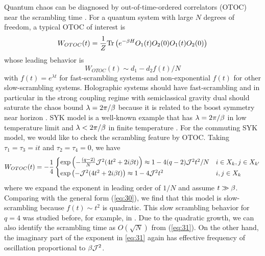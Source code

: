 \documentclass[11pt]{article}
\renewcommand{\>}{\rangle}
\newcommand{\<}{\langle}
\begin{document}
Quantum chaos can be diagnosed by out-of-time-ordered correlators
(OTOC) near the scrambling time \cite{Shenker:2013pqa, kitaev2014hidden, Roberts:2014ifa}. For a quantum system with large $N$ degrees of freedom, a typical OTOC of interest
is 
\begin{equation}
W_{OTOC}(t)=\frac{1}{Z}\text{Tr}\left(e^{-\beta H}O_{1}(t)O_{2}(0)O_{1}(t)O_{2}(0)\right)\label{eq:29}
\end{equation}
whose leading behavior is
\begin{equation}
W_{OTOC}(t)\sim d_{1}-d_{2}f(t)/N\label{eq:30}
\end{equation}
with $f(t)=e^{\lambda t}$ for fast-scrambling systems \cite{Shenker:2013pqa, kitaev2014hidden, Roberts:2014ifa,Shenker:2013yza,Shenker:2014cwa,Maldacena:2016hyu} and
non-exponential $f(t)$ for other slow-scrambling systems.
Holographic systems should have fast-scrambling and in particular
in the strong coupling regime with semiclassical gravity dual should saturate
the chaos bound $\lambda=2\pi/\beta$ \cite{Maldacena:2015waa} because it is related
to the boost symmetry near horizon \cite{Shenker:2013pqa}. SYK model is a well-known
example that has $\lambda=2\pi/\beta$ in low temperature limit and $\lambda<2\pi/\beta$
in finite temperature \cite{Maldacena:2016hyu}. For the commuting SYK model, we would
like to check the scrambling feature by OTOC. Taking $\tau_{1}=\tau_{3}=it$
and $\tau_{2}=\tau_{4}=0$, we have
\begin{equation}
W_{OTOC}(t)=-\frac{1}{4}\begin{cases}
\exp\left(-\frac{(q-2)}{N}\mathcal{J}^{2}(4t^{2}+2i\beta t)\right)\approx1-4(q-2)\mathcal{J}^{2}t^{2}/N & i\in X_{k},j\in X_{k'}\\
\exp\left(-\mathcal{J}^{2}(4t^{2}+2i\beta t)\right)\approx1-4\mathcal{J}^{2}t^{2} & i,j\in X_{k}
\end{cases}\label{eq:31}
\end{equation}
where we expand the exponent in leading order of $1/N$ and assume $t\gg \beta$. Comparing with the general form (\ref{eq:30}), we find that this
model is slow-scrambling because $f(t)\sim t^{2}$ is quadratic. This slow scrambling behavior for $q=4$  was studied before, for example, in \cite{Swingle:2016jdj}. Due
to the quadratic growth, we can also identify the scrambling time
as $O(\sqrt{N})$ from (\ref{eq:31}). On the other hand, the imaginary part of the exponent in \eqref{eq:31} again has effective frequency of oscillation proportional to $\beta\mathcal{J}^2$.
\end{document}
